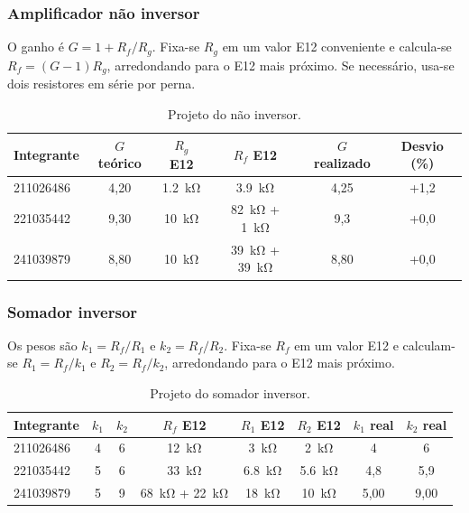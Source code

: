 \documentclass[11pt,a4paper]{article}
\begin{document}
\subsubsection{Amplificador não inversor}

O ganho é $G = 1 + R_f/R_g$. Fixa-se $R_g$ em um valor E12 conveniente e calcula-se $R_f = (G-1)R_g$, arredondando para o E12 mais próximo. Se necessário, usa-se dois resistores em série por perna.

\begin{table}[h]
\centering
\caption{Projeto do não inversor.}
\label{tab:projeto_nao_inv}
\begin{tabular}{lccccc}
\hline
Integrante & $G$ teórico & $R_g$ E12 & $R_f$ E12 & $G$ realizado & Desvio (\%) \\
\hline
211026486 & 4,20 & \SI{1,2}{\kilo\ohm} & \SI{3,9}{\kilo\ohm} & 4,25 & +1,2 \\
221035442 & 9,30 & \SI{10}{\kilo\ohm} & \SI{82}{\kilo\ohm} + \SI{1}{\kilo\ohm} & 9,3 & +0,0 \\
241039879 & 8,80 & \SI{10}{\kilo\ohm} & \SI{39}{\kilo\ohm} + \SI{39}{\kilo\ohm} & 8,80 & +0,0 \\
\hline
\end{tabular}
\end{table}

\subsubsection{Somador inversor}

Os pesos são $k_1 = R_f/R_1$ e $k_2 = R_f/R_2$. Fixa-se $R_f$ em um valor E12 e calculam-se $R_1 = R_f/k_1$ e $R_2 = R_f/k_2$, arredondando para o E12 mais próximo.

\begin{table}[h]
\centering
\caption{Projeto do somador inversor.}
\label{tab:projeto_somador}
\begin{tabular}{lccccccc}
\hline
Integrante & $k_1$ & $k_2$ & $R_f$ E12 & $R_1$ E12 & $R_2$ E12 & $k_1$ real & $k_2$ real \\
\hline
211026486 & 4 & 6 & \SI{12}{\kilo\ohm} & \SI{3}{\kilo\ohm} & \SI{2}{\kilo\ohm} & 4 & 6 \\
221035442 & 5 & 6 & \SI{33}{\kilo\ohm} & \SI{6,8}{\kilo\ohm} & \SI{5,6}{\kilo\ohm} & 4,8 & 5,9 \\
241039879 & 5 & 9 & \SI{68}{\kilo\ohm} + \SI{22}{\kilo\ohm} & \SI{18}{\kilo\ohm} & \SI{10}{\kilo\ohm} & 5,00 & 9,00 \\
\hline
\end{tabular}
\end{table}
\end{document}
